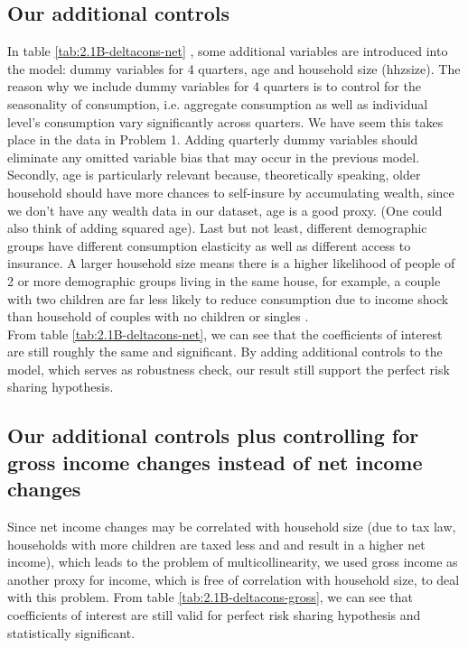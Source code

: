 \documentclass[12pt,a4paper]{article}
\begin{document}
\subsection*{Our additional controls} 

In table \ref{tab:2.1B-deltacons-net} , some additional variables are introduced into the model: dummy variables for 4 quarters, age and household size (hhzsize). The reason why we include dummy variables for 4 quarters is to control for the seasonality of consumption, i.e. aggregate consumption as well as individual level's consumption vary significantly across quarters. We have seem this takes place in the data in Problem 1. Adding quarterly dummy variables should eliminate any omitted variable bias that may occur in the previous model. Secondly, age is particularly relevant because, theoretically speaking, older household should have more chances to self-insure by accumulating wealth, since we don't have any wealth data in our dataset, age is a good proxy. (One could also think of adding squared age). Last but not least, different demographic groups have different consumption elasticity as well as different access to insurance. A larger household size means there is a higher likelihood of people of 2 or more demographic groups living in the same house, for example, a couple with two children are far less likely to reduce consumption due to income shock than household of couples with no children or singles  
. \\

From table \ref{tab:2.1B-deltacons-net}, we can see that the coefficients of interest are still roughly the same and significant. By adding additional controls to the model, which serves as robustness check, our result still support the perfect risk sharing hypothesis.  

\subsection*{Our additional controls plus controlling for gross income changes instead of net income changes} 
Since net income changes may be correlated with household size (due to tax law, households with more children are taxed less and and result in a higher net income), which leads to the problem of multicollinearity, we used gross income as another proxy for income, which is free of correlation with household size, to deal with this problem. From table \ref{tab:2.1B-deltacons-gross}, we can see that coefficients of interest are still valid for perfect risk sharing hypothesis and statistically significant. 

\end{document}
